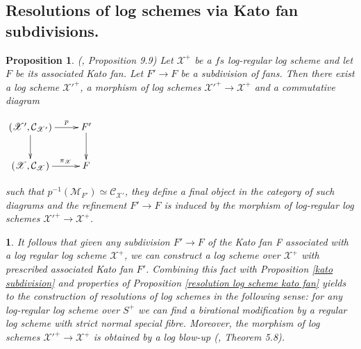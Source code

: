 \documentclass{amsart}%
\numberwithin{equation}{subsection}
\theoremstyle{plain2}
\newtheorem{prop}[equation]{Proposition}
\theoremstyle{definition2}
\theoremstyle{stepstyle}
\theoremstyle{point}
\theoremstyle{subpoint}
\newtheorem{subpoint}[equation]{}%
\newcommand{\spa}[1]{\begin{subpoint}#1\end{subpoint}}           %
\newcommand{\cX}{\ensuremath{\mathscr{X}}}
\newcommand{\caM}{\ensuremath{\mathcal{M}}}
\newcommand{\caC}{\ensuremath{\mathcal{C}}}
\begin{document}
\subsection{Resolutions of log schemes via Kato fan subdivisions.} \label{section resolution via kato subd}
\begin{prop} (\cite{Kato1994a}, Proposition 9.9) \label{prop morphism induced by subdivision kato fan}
Let $\cX^+$ be a $fs$ log-regular log scheme and let $F$ be its associated Kato fan. Let $F' \rightarrow F$ be a subdivision of fans. Then there exist a log scheme ${\cX'}^+$, a morphism of log schemes ${\cX'}^+ \rightarrow \cX^+$ and a commutative diagram
\begin{center}
$\begin{gathered}
\xymatrixcolsep{2pc} \xymatrix{
  (\cX', \caC_{\cX'}) \ar[r]^-{p} \ar[d]^{} & F' \ar[d]^{}\\
  (\cX, \caC_{\cX}) \ar[r]^-{\pi_{\cX}}   & F
}
\end{gathered}$\end{center}such that $p^{-1}(\caM_{F'}) \simeq \caC_{\cX'}$, they define a final object in the category of such diagrams and the refinement $F'\to F$ is induced by the morphism of log-regular log schemes $\cX'^+ \rightarrow \cX^+$.
\end{prop}

\spa{\label{rem resolution via subd}
It follows that given any subdivision $F' \rightarrow F$ of the Kato fan F associated with a log regular log scheme $\cX^+$, we can construct a log scheme over $\cX^+$ with prescribed associated Kato fan $F'$. Combining this fact with Proposition \ref{kato subdivision} and properties of Proposition \ref{resolution log scheme kato fan} yields to the construction of resolutions of log schemes in the following sense: for any log-regular log scheme over $S^+$ we can find a birational modification by a regular log scheme with strict normal special fibre. Moreover, the morphism of log schemes ${\cX'}^+ \rightarrow \cX^+$ is obtained by a log blow-up  (\cite{Niziol2006}, Theorem 5.8).} 
\end{document}
